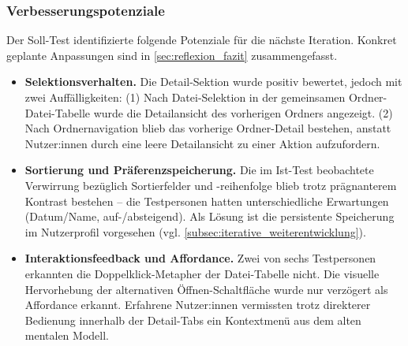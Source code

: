 \subsubsection{Verbesserungspotenziale}

Der Soll-Test identifizierte folgende Potenziale für die nächste Iteration. Konkret geplante Anpassungen sind in \autoref{sec:reflexion_fazit} zusammengefasst.

\begin{itemize}
    \item \textbf{Selektionsverhalten.} Die Detail-Sektion wurde positiv bewertet, jedoch mit zwei Auffälligkeiten: (1) Nach Datei-Selektion in der gemeinsamen Ordner-\/\hspace{0.5pt}Datei-Tabelle wurde die Detailansicht des vorherigen Ordners angezeigt. (2) Nach Ordnernavigation blieb das vorherige Ordner-Detail bestehen, anstatt Nutzer:innen durch eine leere Detailansicht zu einer Aktion aufzufordern.

    \item \textbf{Sortierung und Präferenzspeicherung.} Die im Ist-Test beobachtete Verwirrung bezüglich Sortierfelder und -\/reihenfolge blieb trotz prägnanterem Kontrast bestehen -- die Testpersonen hatten unterschiedliche Erwartungen (Datum/Name, auf-/absteigend). Als Lösung ist die persistente Speicherung im Nutzerprofil vorgesehen (vgl. \autoref{subsec:iterative_weiterentwicklung}).

    \item \textbf{Interaktionsfeedback und Affordance.} Zwei von sechs Testpersonen erkannten die Doppelklick-Metapher der Datei-Tabelle nicht. Die visuelle Hervorhebung der alternativen Öffnen-Schaltfläche wurde nur verzögert als Affordance erkannt. Erfahrene Nutzer:innen vermissten trotz direkterer Bedienung innerhalb der Detail-Tabs ein Kontextmenü aus dem alten mentalen Modell.
\end{itemize}
